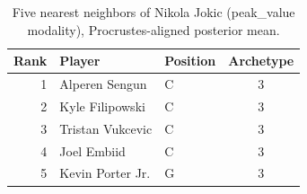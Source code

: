 \begin{table}[htbp]
  \centering\small
  \begin{tabular}{rllc}
    \toprule
    Rank & Player & Position & Archetype \\
    \midrule
    1 & Alperen Sengun & C & 3 \\
    2 & Kyle Filipowski & C & 3 \\
    3 & Tristan Vukcevic & C & 3 \\
    4 & Joel Embiid & C & 3 \\
    5 & Kevin Porter Jr. & G & 3 \\
    \bottomrule
  \end{tabular}
  \caption{Five nearest neighbors of Nikola Jokic (peak_value modality), Procrustes-aligned posterior mean.}
  \label{tab:Nikola_Jokic_neighbors_peak_value}
\end{table}

